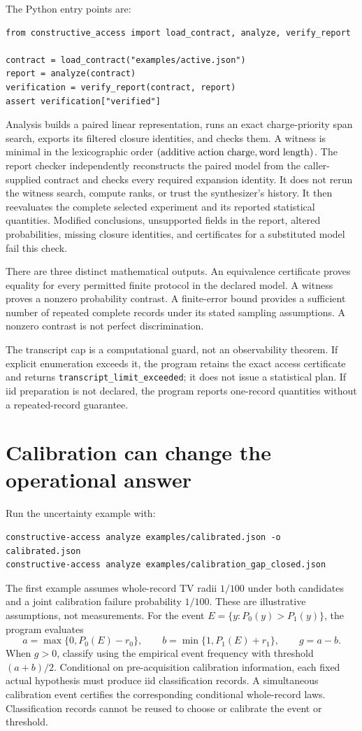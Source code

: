 The Python entry points are:
\begin{verbatim}
from constructive_access import load_contract, analyze, verify_report

contract = load_contract("examples/active.json")
report = analyze(contract)
verification = verify_report(contract, report)
assert verification["verified"]
\end{verbatim}
Analysis builds a paired linear representation, runs an exact
charge-priority span search, exports its filtered closure identities, and
checks them. A witness is minimal in the lexicographic order
\((\hbox{additive action charge},\hbox{word length})\).
The report checker independently reconstructs the paired model from the
caller-supplied contract and checks every required expansion identity.
It does not rerun the witness search, compute ranks, or trust the
synthesizer's history. It then reevaluates the complete selected experiment
and its reported statistical quantities. Modified conclusions, unsupported
fields in the report, altered probabilities, missing closure identities,
and certificates for a substituted model fail this check.

There are three distinct mathematical outputs. An equivalence certificate
proves equality for every permitted finite protocol in the declared model.
A witness proves a nonzero probability contrast. A finite-error bound
provides a sufficient number of repeated complete records under its stated
sampling assumptions. A nonzero contrast is not perfect discrimination.

The transcript cap is a computational guard, not an observability theorem.
If explicit enumeration exceeds it, the program retains the exact access
certificate and returns \texttt{transcript\_limit\_exceeded}; it does not
issue a statistical plan. If iid preparation is not declared, the program
reports one-record quantities without a repeated-record guarantee.

\section{Calibration can change the operational answer}

Run the uncertainty example with:
\begin{verbatim}
constructive-access analyze examples/calibrated.json -o calibrated.json
constructive-access analyze examples/calibration_gap_closed.json
\end{verbatim}
The first example assumes whole-record TV radii $1/100$ under both
candidates and a joint calibration failure probability $1/100$. These are
illustrative assumptions, not measurements. For the event
$E=\{y:P_0(y)>P_1(y)\}$, the program evaluates
\[
 a=\max\{0,P_0(E)-r_0\},\qquad
 b=\min\{1,P_1(E)+r_1\},\qquad g=a-b.
\]
When $g>0$, classify using the empirical event frequency with threshold
$(a+b)/2$. Conditional on pre-acquisition calibration information, each
fixed actual hypothesis must produce iid classification records. A
simultaneous calibration event certifies the corresponding conditional
whole-record laws. Classification records cannot be reused to choose or
calibrate the event or threshold.

